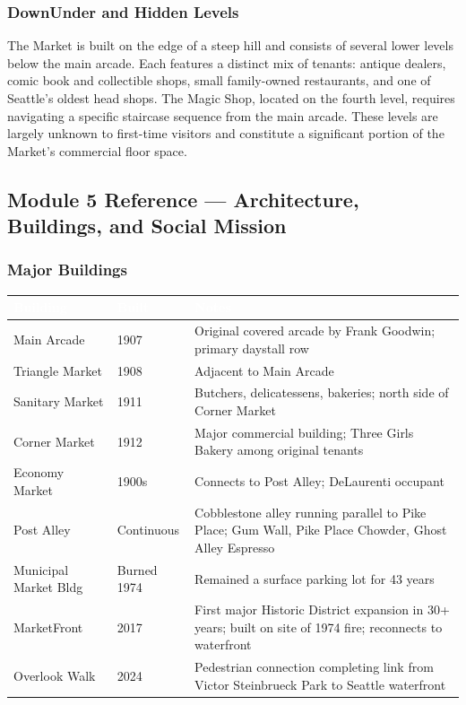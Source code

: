 \documentclass[11pt,letterpaper]{article}
\newcommand{\tableheader}[1]{\textbf{\sffamily\textcolor{white}{#1}}}
\begin{document}
\subsubsection{DownUnder and Hidden Levels}

The Market is built on the edge of a steep hill and consists of several lower levels below the main arcade. Each features a distinct mix of tenants: antique dealers, comic book and collectible shops, small family-owned restaurants, and one of Seattle's oldest head shops. The Magic Shop, located on the fourth level, requires navigating a specific staircase sequence from the main arcade. These levels are largely unknown to first-time visitors and constitute a significant portion of the Market's commercial floor space.

\subsection{Module 5 Reference --- Architecture, Buildings, and Social Mission}

\subsubsection{Major Buildings}

\begin{center}
\begin{tabularx}{\textwidth}{L{4cm}C{2cm}X}
\toprule
{}
\tableheader{Building} & \tableheader{Built} & \tableheader{Notes} \\
\midrule
Main Arcade & 1907 & Original covered arcade by Frank Goodwin; primary daystall row \\
Triangle Market & 1908 & Adjacent to Main Arcade \\
Sanitary Market & 1911 & Butchers, delicatessens, bakeries; north side of Corner Market \\
Corner Market & 1912 & Major commercial building; Three Girls Bakery among original tenants \\
Economy Market & 1900s & Connects to Post Alley; DeLaurenti occupant \\
Post Alley & Continuous & Cobblestone alley running parallel to Pike Place; Gum Wall, Pike Place Chowder, Ghost Alley Espresso \\
Municipal Market Bldg & Burned 1974 & Remained a surface parking lot for 43 years \\
MarketFront & 2017 & First major Historic District expansion in 30+ years; built on site of 1974 fire; reconnects to waterfront \\
Overlook Walk & 2024 & Pedestrian connection completing link from Victor Steinbrueck Park to Seattle waterfront \\
\bottomrule
\end{tabularx}
\end{center}
\end{document}
